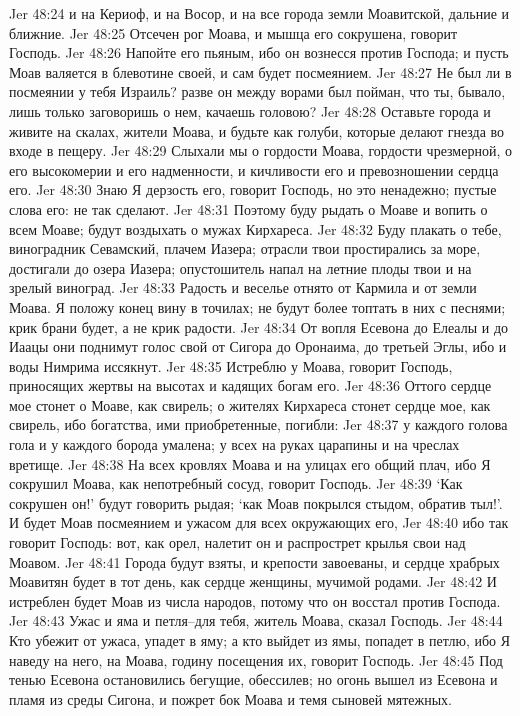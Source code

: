 Jer 48:24  и на Кериоф, и на Восор, и на все города земли Моавитской, дальние и ближние.
Jer 48:25  Отсечен рог Моава, и мышца его сокрушена, говорит Господь.
Jer 48:26  Напойте его пьяным, ибо он вознесся против Господа; и пусть Моав валяется в блевотине своей, и сам будет посмеянием.
Jer 48:27  Не был ли в посмеянии у тебя Израиль? разве он между ворами был пойман, что ты, бывало, лишь только заговоришь о нем, качаешь головою?
Jer 48:28  Оставьте города и живите на скалах, жители Моава, и будьте как голуби, которые делают гнезда во входе в пещеру.
Jer 48:29  Слыхали мы о гордости Моава, гордости чрезмерной, о его высокомерии и его надменности, и кичливости его и превозношении сердца его.
Jer 48:30  Знаю Я дерзость его, говорит Господь, но это ненадежно; пустые слова его: не так сделают.
Jer 48:31  Поэтому буду рыдать о Моаве и вопить о всем Моаве; будут воздыхать о мужах Кирхареса.
Jer 48:32  Буду плакать о тебе, виноградник Севамский, плачем Иазера; отрасли твои простирались за море, достигали до озера Иазера; опустошитель напал на летние плоды твои и на зрелый виноград.
Jer 48:33  Радость и веселье отнято от Кармила и от земли Моава. Я положу конец вину в точилах; не будут более топтать в них с песнями; крик брани будет, а не крик радости.
Jer 48:34  От вопля Есевона до Елеалы и до Иаацы они поднимут голос свой от Сигора до Оронаима, до третьей Эглы, ибо и воды Нимрима иссякнут.
Jer 48:35  Истреблю у Моава, говорит Господь, приносящих жертвы на высотах и кадящих богам его.
Jer 48:36  Оттого сердце мое стонет о Моаве, как свирель; о жителях Кирхареса стонет сердце мое, как свирель, ибо богатства, ими приобретенные, погибли:
Jer 48:37  у каждого голова гола и у каждого борода умалена; у всех на руках царапины и на чреслах вретище.
Jer 48:38  На всех кровлях Моава и на улицах его общий плач, ибо Я сокрушил Моава, как непотребный сосуд, говорит Господь.
Jer 48:39  `Как сокрушен он!' будут говорить рыдая; `как Моав покрылся стыдом, обратив тыл!'. И будет Моав посмеянием и ужасом для всех окружающих его,
Jer 48:40  ибо так говорит Господь: вот, как орел, налетит он и распрострет крылья свои над Моавом.
Jer 48:41  Города будут взяты, и крепости завоеваны, и сердце храбрых Моавитян будет в тот день, как сердце женщины, мучимой родами.
Jer 48:42  И истреблен будет Моав из числа народов, потому что он восстал против Господа.
Jer 48:43  Ужас и яма и петля--для тебя, житель Моава, сказал Господь.
Jer 48:44  Кто убежит от ужаса, упадет в яму; а кто выйдет из ямы, попадет в петлю, ибо Я наведу на него, на Моава, годину посещения их, говорит Господь.
Jer 48:45  Под тенью Есевона остановились бегущие, обессилев; но огонь вышел из Есевона и пламя из среды Сигона, и пожрет бок Моава и темя сыновей мятежных.
